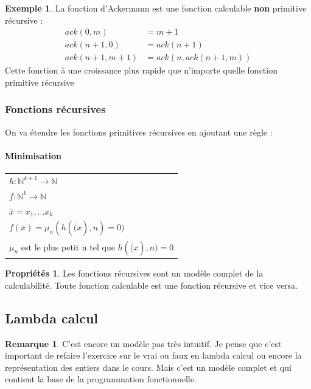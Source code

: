 \documentclass[11pt,a4paper]{article}
\newcommand{\stcomp}[1]{\overline{#1}}
\newcommand{\N}{\mathbb{N}}
\theoremstyle{definition}
\newtheorem{myprop}[mydef]{Propriétés}
\newtheorem{myrem}[mydef]{Remarque}
\newtheorem{myexem}[mydef]{Exemple}
\begin{document}
\begin{myexem}
	La fonction d'Ackermann est une fonction calculable \textbf{non} 
	primitive récursive :
	\begin{align}
		ack(0,m) &= m+1 \\
		ack(n+1,0) &= ack(n+1)\\
		ack(n+1,m+1) &= ack(n, ack(n+1,m))
	\end{align}
	Cette fonction à une croissance plus rapide que n'importe quelle fonction 
	primitive récursive
\end{myexem}


\subsubsection{Fonctions récursives}
\label{ssub:fonctions_r_cursives}
On va étendre les fonctions primitives récursives en ajoutant une règle :

\paragraph{Minimisation}
\begin{tabular}{|l|}
	\hline
	$h: \N^{k+1} \rightarrow \N$\\
	$f: \N^{k} \rightarrow \N$\\
	$\stcomp{x} =x_1,...x_k$ \\
	$f(\overline{x}) = \mu_n (h(\overline(x), n) =0)$\\
	$\mu_n$ est le plus petit n tel que $h(\overline(x), n) =0$ \\
	\hline
\end{tabular}

\begin{myprop}
	Les fonctions récursives sont un modèle complet de la calculabilité. 
	Toute fonction calculable est une fonction récursive et vice versa.
\end{myprop}

\subsection{Lambda calcul}
\label{sub:lambda_calcul}
\begin{myrem}
	C'est encore un modèle pas très intuitif. Je pense que c'est important 
	de refaire l'exercice sur le vrai ou faux en lambda calcul ou encore la 
	représentation des entiers dans le cours. Mais c'est un modèle complet 
	et qui contient la base de la programmation fonctionnelle.
\end{myrem}
\end{document}
